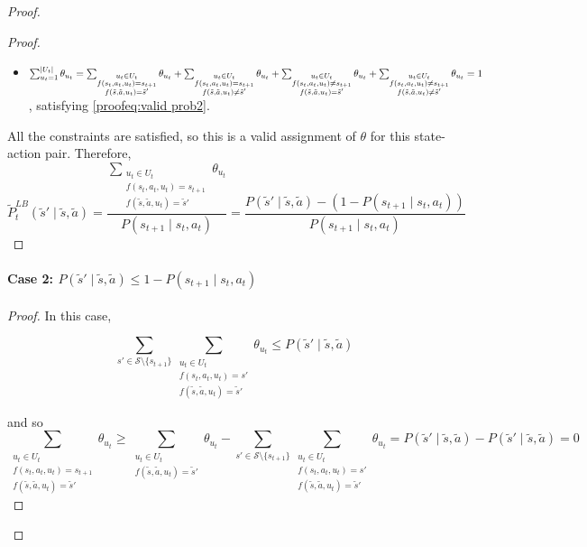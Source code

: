 \begin{proof}
\begin{proof}
\begin{itemize}
    \item $\sum_{u_t = 1}^{|U_t|} \theta_{u_t} = \sum_{\substack{u_t \in U_t \\f(s_t, a_t, u_t) = s_{t+1} \\ f(\tilde{s}, \tilde{a}, u_t) = \tilde{s}'}} \theta_{u_t} + \sum_{\substack{u_t \in U_t \\f(s_t, a_t, u_t) = s_{t+1} \\ f(\tilde{s}, \tilde{a}, u_t) \neq \tilde{s}'}} \theta_{u_t} + \sum_{\substack{u_t \in U_t \\f(s_t, a_t, u_t) \neq s_{t+1} \\ f(\tilde{s}, \tilde{a}, u_t) = \tilde{s}'}} \theta_{u_t} \\+ \sum_{\substack{u_t \in U_t \\f(s_t, a_t, u_t) \neq s_{t+1} \\ f(\tilde{s}, \tilde{a}, u_t) \neq \tilde{s}'}} \theta_{u_t} = 1$, satisfying \eqref{proofeq:valid prob2}.
\end{itemize}

All the constraints are satisfied, so this is a valid assignment of $\theta$ for this state-action pair. Therefore,
 \[\tilde{P}_{t}^{LB}(\tilde{s}' \mid \tilde{s}, \tilde{a}) = \dfrac{\sum_{\substack{u_t \in U_t \\f(s_t, a_t, u_t) = s_{t+1} \\ f(\tilde{s}, \tilde{a}, u_t) = \tilde{s}'}} \theta_{u_t}}{P(s_{t+1} \mid s_t, a_t)}= \frac{P(\tilde{s}' \mid \tilde{s}, \tilde{a}) - (1 - P(s_{t+1} \mid s_t, a_t))}{P(s_{t+1} \mid s_t, a_t)}\]
\end{proof}

\paragraph{Case 2: $P(\tilde{s}' \mid \tilde{s}, \tilde{a}) \leq 1- P(s_{t+1} \mid s_t, a_t)$}
\begin{proof}
In this case,

\[
    \sum_{s' \in \mathcal{S}\setminus{\{s_{t+1}\}}}\sum_{\substack{u_t \in U_t \\f(s_t, a_t, u_t) = s' \\ f(\tilde{s}, \tilde{a}, u_t) = \tilde{s}'}} \theta_{u_t} \leq P(\tilde{s}' \mid \tilde{s}, \tilde{a})
\]

and so
\[
\sum_{\substack{u_t \in U_t \\f(s_t, a_t, u_t) = s_{t+1} \\ f(\tilde{s}, \tilde{a}, u_t) = \tilde{s}'}} \theta_{u_t} \geq \sum_{\substack{u_t \in U_t \\ f(\tilde{s}, \tilde{a}, u_t) = \tilde{s}'}} \theta_{u_t} - \sum_{s' \in \mathcal{S}\setminus{\{s_{t+1}\}}}\sum_{\substack{u_t \in U_t \\f(s_t, a_t, u_t) = s' \\ f(\tilde{s}, \tilde{a}, u_t) = \tilde{s}'}} \theta_{u_t}= P(\tilde{s}' \mid \tilde{s}, \tilde{a}) - P(\tilde{s}' \mid \tilde{s}, \tilde{a}) = 0
\]


\end{proof}
\end{proof}
